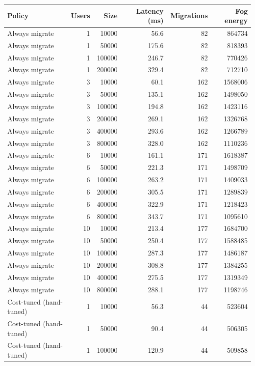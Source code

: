 \begin{table}[h]
\centering
\begin{tabular}{@{}lrrrrr@{}}
\toprule
Policy & Users & Size & Latency (ms) & Migrations & Fog energy \\
\midrule
Always migrate & 1 & 10000 & 56.6 & 82 & 864734 \\
Always migrate & 1 & 50000 & 175.6 & 82 & 818393 \\
Always migrate & 1 & 100000 & 246.7 & 82 & 770426 \\
Always migrate & 1 & 200000 & 329.4 & 82 & 712710 \\
Always migrate & 3 & 10000 & 60.1 & 162 & 1568006 \\
Always migrate & 3 & 50000 & 135.1 & 162 & 1498050 \\
Always migrate & 3 & 100000 & 194.8 & 162 & 1423116 \\
Always migrate & 3 & 200000 & 269.1 & 162 & 1326768 \\
Always migrate & 3 & 400000 & 293.6 & 162 & 1266789 \\
Always migrate & 3 & 800000 & 328.0 & 162 & 1110236 \\
Always migrate & 6 & 10000 & 161.1 & 171 & 1618387 \\
Always migrate & 6 & 50000 & 221.3 & 171 & 1498709 \\
Always migrate & 6 & 100000 & 263.2 & 171 & 1409033 \\
Always migrate & 6 & 200000 & 305.5 & 171 & 1289839 \\
Always migrate & 6 & 400000 & 322.9 & 171 & 1218423 \\
Always migrate & 6 & 800000 & 343.7 & 171 & 1095610 \\
Always migrate & 10 & 10000 & 213.4 & 177 & 1684700 \\
Always migrate & 10 & 50000 & 250.4 & 177 & 1588485 \\
Always migrate & 10 & 100000 & 287.3 & 177 & 1486187 \\
Always migrate & 10 & 200000 & 308.8 & 177 & 1384255 \\
Always migrate & 10 & 400000 & 275.5 & 177 & 1319349 \\
Always migrate & 10 & 800000 & 288.1 & 177 & 1198746 \\
Cost-tuned (hand-tuned) & 1 & 10000 & 56.3 & 44 & 523604 \\
Cost-tuned (hand-tuned) & 1 & 50000 & 90.4 & 44 & 506305 \\
Cost-tuned (hand-tuned) & 1 & 100000 & 120.9 & 44 & 509858 \\

\end{tabular}
\end{table}

